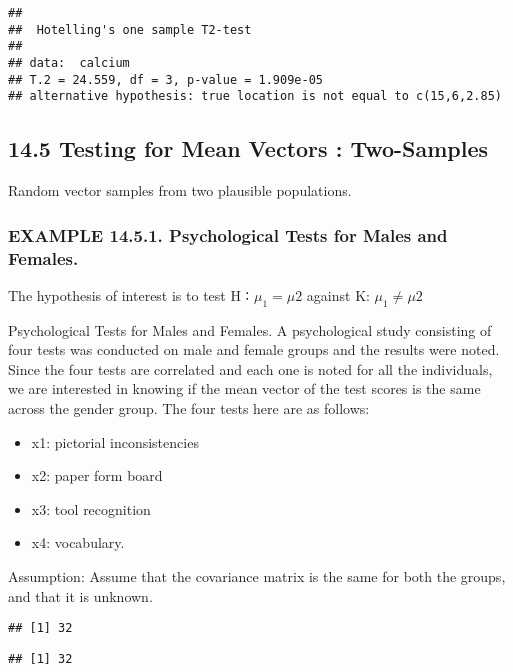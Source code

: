 \documentclass[]{article}
\providecommand{\tightlist}{%
  \setlength{\itemsep}{0pt}\setlength{\parskip}{0pt}}
\begin{document}
\begin{verbatim}
## 
##  Hotelling's one sample T2-test
## 
## data:  calcium
## T.2 = 24.559, df = 3, p-value = 1.909e-05
## alternative hypothesis: true location is not equal to c(15,6,2.85)
\end{verbatim}

\hypertarget{testing-for-mean-vectors-two-samples}{%
\subsection{14.5 Testing for Mean Vectors :
Two-Samples}\label{testing-for-mean-vectors-two-samples}}

Random vector samples from two plausible populations.

\hypertarget{example-14.5.1.-psychological-tests-for-males-and-females.}{%
\subsubsection{EXAMPLE 14.5.1. Psychological Tests for Males and
Females.}\label{example-14.5.1.-psychological-tests-for-males-and-females.}}

The hypothesis of interest is to test H ∶ \(\mu_1 = \mu2\) against K:
\(\mu_1 \ne \mu2\)

Psychological Tests for Males and Females. A psychological study
consisting of four tests was conducted on male and female groups and the
results were noted. Since the four tests are correlated and each one is
noted for all the individuals, we are interested in knowing if the mean
vector of the test scores is the same across the gender group. The four
tests here are as follows:

\begin{itemize}
\tightlist
\item
  x1: pictorial inconsistencies
\item
  x2: paper form board
\item
  x3: tool recognition
\item
  x4: vocabulary.
\end{itemize}

Assumption: Assume that the covariance matrix is the same for both the
groups, and that it is unknown.

\begin{verbatim}
## [1] 32
\end{verbatim}

\begin{verbatim}
## [1] 32
\end{verbatim}
\end{document}
